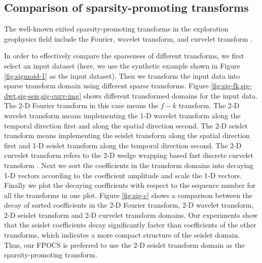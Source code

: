 \subsection{Comparison of sparsity-promoting transforms}
The well-known exited sparsity-promoting transforms in the exploration geophysics field include the Fourier\cite[]{chandrasekharan1949}, wavelet transform\cite[]{akansu2010}, and curvelet transform \cite[]{candes20061}. 

In order to effectively compare the sparseness of different transforms, we first select an input dataset (here, we use the synthetic example shown in Figure \ref{fig:sigmoid-1} as the input dataset). Then we transform the input data into sparse transform domain using different sparse transforms. Figure \ref{fig:sig-fk,sig-dwt,sig-seis,sig-curv-img} shows different transformed domains for the input data. The 2-D Fourier transform in this case means the $f-k$ transform. The 2-D wavelet transform means implementing the 1-D wavelet transform along the temporal direction first and along the spatial direction second. The 2-D seislet transform means implementing the seislet transform along the spatial direction first and 1-D seislet transform along the temporal direction second. The 2-D curvelet transform refers to the 2-D wedge wrapping based fast discrete curvelet transform \cite[]{candes20061}. Next we sort the coefficients in the transform domains into decaying 1-D vectors according to the coefficient amplitude and scale the 1-D vectors. Finally we plot the decaying coefficients with respect to the sequence number for all the transforms in one plot. Figure \ref{fig:sig-c} shows a comparison between the decay of sorted coefficients in the 2-D Fourier transform, 2-D wavelet transform, 2-D seislet transform and 2-D curvelet transform domains. Our experiments show that the seislet coefficients decay significantly faster than coefficients of the other transforms, which indicates a more compact structure of the seislet domain. Thus, our FPOCS is preferred to use the 2-D seislet transform domain as the sparsity-promoting transform.



